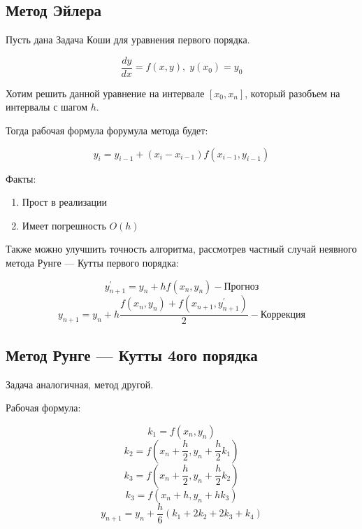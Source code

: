 \documentclass{article}
\begin{document}
\subsection{Метод Эйлера}

Пусть дана Задача Коши для уравнения первого порядка.

\begin{equation}
    \frac{dy}{dx} = f(x, y), \; y(x_0) = y_0
\end{equation}

Хотим решить данной уравнение на интервале $[x_0, x_n]$,
который разобъем на интервалы с шагом $h$.

Тогда рабочая формула форумула метода будет:

\begin{equation}
    y_i = y_{i-1} + (x_i - x_{i-1})f(x_{i-1}, y_{i-1})
\end{equation}

Факты:
\begin{enumerate}
    \item Прост в реализации
    \item Имеет погрешность $O(h)$
\end{enumerate}

Также можно улучшить точность алгоритма, 
рассмотрев частный случай неявного метода Рунге — Кутты 
первого порядка:

\begin{equation}
    y^{'}_{n+1} = y_n + hf(x_n, y_n) - \text{Прогноз}
\end{equation}
\begin{equation}
    y_{n+1} = y_n + h \frac{f(x_n, y_n) + f(x_{n+1}, y^{'}_{n+1})}{2}
    - \text{Коррекция}
\end{equation}




\subsection{Метод Рунге — Кутты 4ого порядка}

Задача аналогичная, метод другой.

Рабочая формула:

\begin{equation}
    k_1 = f(x_n, y_n)
\end{equation}
\begin{equation}
    k_2 = f(x_n + \frac{h}{2}, y_n + \frac{h}{2} k_1)
\end{equation}
\begin{equation}
    k_3 = f(x_n + \frac{h}{2}, y_n + \frac{h}{2} k_2)
\end{equation}
\begin{equation}
    k_3 = f(x_n + h, y_n + hk_3)
\end{equation}
\begin{equation}
    y_{n+1} = y_n + \frac{h}{6}(k_1 + 2k_2 + 2k_3 + k_4)
\end{equation}
\end{document}
